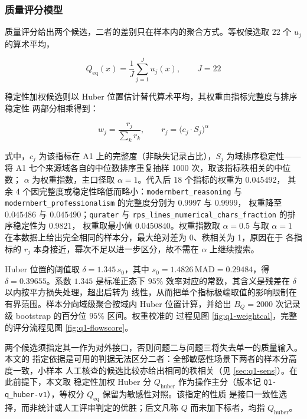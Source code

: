 \documentclass[bwprint]{gmcmthesis}
\numberwithin{equation}{section}
\numberwithin{figure}{section}
\numberwithin{table}{section}
\begin{document}
\subsubsection{质量评分模型}

质量评分给出两个候选，二者的差别只在样本内的聚合方式。等权候选取 22 个 $u_j$
的算术平均，

\begin{equation}
Q_{\mathrm{eq}}(x)=\frac{1}{J}\sum_{j=1}^{J}u_j(x),\qquad J=22
\end{equation}

稳定性加权候选则以 Huber 位置估计替代算术平均，其权重由指标完整度与排序稳定性
两部分相乘得到：

\begin{equation}
w_j=\frac{r_j}{\sum_{k}r_k},\qquad
r_j=\bigl(c_j\cdot S_j\bigr)^{\alpha}
\end{equation}

式中，$c_j$ 为该指标在 A1 上的完整度（非缺失记录占比），$S_j$ 为域排序稳定性——
将 A1 七个来源域各自的中位数排序重复抽样 1000 次，取该指标秩相关的中位数；
$\alpha$ 为权重指数，主口径取 $\alpha=1$。代入后 18 个指标的权重为 $0.045492$，
其余 4 个因完整度或稳定性略低而略小：\texttt{modernbert\_reasoning} 与
\texttt{modernbert\_professionalism} 的完整度分别为 $0.9997$ 与 $0.9999$，
权重降至 $0.045486$ 与 $0.045490$；\texttt{qurater} 与
\texttt{rps\_lines\_numerical\_chars\_fraction} 的排序稳定性为 $0.9821$，
权重取最小值 $0.0450840$。权重指数取 $\alpha=0.5$ 与取
$\alpha=1$ 在本数据上给出完全相同的样本分，最大绝对差为 0、秩相关为 1，原因在于
各指标的 $r_j$ 本身接近，幂次不足以进一步区分，故不需在 $\alpha$ 上继续搜索。

Huber 位置的阈值取 $\delta=1.345\,s_0$，其中
$s_0=1.4826\,\mathrm{MAD}=0.29484$，得 $\delta=0.39655$。系数 $1.345$ 是标准正态下
$95\%$ 效率对应的常数，其含义是残差在 $\delta$ 以内按平方损失处理，超出后转为
线性，从而把单个指标极端取值的影响限制在有界范围。样本分向域级聚合按域内 Huber
位置计算，并给出 $B_Q=2000$ 次记录级 bootstrap 的百分位 $95\%$ 区间。权重校准的
过程见图 \ref{fig:q1-weightcal}，完整的评分流程见图 \ref{fig:q1-flowscore}。

两个候选须指定其一作为对外接口，否则问题二与问题三将失去单一的质量输入。本文的
指定依据是可用的判据无法区分二者：全部敏感性场景下两者的样本分高度一致，小样本
人工核查的候选比较亦给出相同的秩相关（见 \ref{sec:q1-sens}）。在此前提下，本文取
稳定性加权 Huber 分 $Q_{\mathrm{huber}}$ 作为操作主分（版本记
\texttt{Q1-q\_huber-v1}），等权分 $Q_{\mathrm{eq}}$ 保留为敏感性对照。该指定的性质
是接口一致性选择，而非统计或人工评审判定的优胜；后文凡称 $Q$ 而未加下标者，均指
$Q_{\mathrm{huber}}$。
\end{document}
